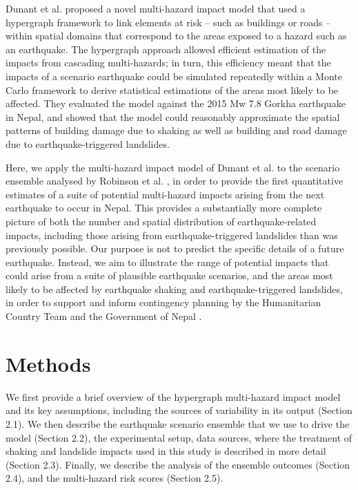 \documentclass[preprint,12pt,authoryear]{elsarticle}
\begin{document}
Dunant et al. \citep{Dunant2025} proposed a novel multi-hazard impact model that used a hypergraph framework to link elements at risk -- such as buildings or roads -- within spatial domains that correspond to the areas exposed to a hazard such as an earthquake. The hypergraph approach allowed efficient estimation of the impacts from cascading multi-hazards; in turn, this efficiency meant that the impacts of a scenario earthquake could be simulated repeatedly within a Monte Carlo framework to derive statistical estimations of the areas most likely to be affected. They evaluated the model against the 2015 Mw 7.8 Gorkha earthquake in Nepal, and showed that the model could reasonably approximate the spatial patterns of building damage due to shaking as well as building and road damage due to earthquake-triggered landslides.

Here, we apply the multi-hazard impact model of Dunant et al. \citep{Dunant2025} to the scenario ensemble analysed by Robinson et al. \citep{Robinson2018}, in order to provide the first quantitative estimates of a suite of potential multi-hazard impacts arising from the next earthquake to occur in Nepal. This provides a substantially more complete picture of both the number and spatial distribution of earthquake-related impacts, including those arising from earthquake-triggered landslides than was previously possible. Our purpose is not to predict the specific details of a future earthquake. Instead, we aim to illustrate the range of potential impacts that could arise from a suite of plausible earthquake scenarios, and the areas most likely to be affected by earthquake shaking and earthquake-triggered landslides, in order to support and inform contingency planning by the Humanitarian Country Team and the Government of Nepal \citep{sijapati2025}.

\section{Methods}
We first provide a brief overview of the hypergraph multi-hazard impact model and its key assumptions, including the sources of variability in its output (Section 2.1). We then describe the earthquake scenario ensemble that we use to drive the model (Section 2.2), the experimental setup, data sources, where the treatment of shaking and landslide impacts used in this study is described in more detail (Section 2.3). Finally, we describe the analysis of the ensemble outcomes (Section 2.4), and the multi-hazard risk scores (Section 2.5).
\end{document}
